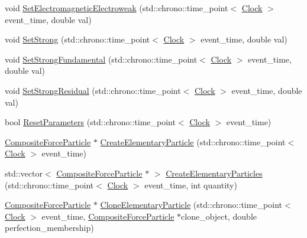 \begin{DoxyCompactItemize}
\item 
void \mbox{\hyperlink{classCompositeForceParticle_ad53c5d396b3c56241174a9bd78f9e07a}{Set\+Electromagnetic\+Electroweak}} (std\+::chrono\+::time\+\_\+point$<$ \mbox{\hyperlink{universe_8h_a0ef8d951d1ca5ab3cfaf7ab4c7a6fd80}{Clock}} $>$ event\+\_\+time, double val)
\item 
void \mbox{\hyperlink{classCompositeForceParticle_a06488ef0457335648b161d3ed746b643}{Set\+Strong}} (std\+::chrono\+::time\+\_\+point$<$ \mbox{\hyperlink{universe_8h_a0ef8d951d1ca5ab3cfaf7ab4c7a6fd80}{Clock}} $>$ event\+\_\+time, double val)
\item 
void \mbox{\hyperlink{classCompositeForceParticle_a28d835658edcbecf60162475a8cb1ab6}{Set\+Strong\+Fundamental}} (std\+::chrono\+::time\+\_\+point$<$ \mbox{\hyperlink{universe_8h_a0ef8d951d1ca5ab3cfaf7ab4c7a6fd80}{Clock}} $>$ event\+\_\+time, double val)
\item 
void \mbox{\hyperlink{classCompositeForceParticle_aeba1070d4ec6e52fd8276e38c6a6c2e1}{Set\+Strong\+Residual}} (std\+::chrono\+::time\+\_\+point$<$ \mbox{\hyperlink{universe_8h_a0ef8d951d1ca5ab3cfaf7ab4c7a6fd80}{Clock}} $>$ event\+\_\+time, double val)
\item 
bool \mbox{\hyperlink{classCompositeForceParticle_ab4767179e32f6d2b4b31941dd3c48b10}{Reset\+Parameters}} (std\+::chrono\+::time\+\_\+point$<$ \mbox{\hyperlink{universe_8h_a0ef8d951d1ca5ab3cfaf7ab4c7a6fd80}{Clock}} $>$ event\+\_\+time)
\item 
\mbox{\hyperlink{classCompositeForceParticle}{Composite\+Force\+Particle}} $\ast$ \mbox{\hyperlink{classCompositeForceParticle_a0806069e389e30c63572c4cd6b9776d7}{Create\+Elementary\+Particle}} (std\+::chrono\+::time\+\_\+point$<$ \mbox{\hyperlink{universe_8h_a0ef8d951d1ca5ab3cfaf7ab4c7a6fd80}{Clock}} $>$ event\+\_\+time)
\item 
std\+::vector$<$ \mbox{\hyperlink{classCompositeForceParticle}{Composite\+Force\+Particle}} $\ast$ $>$ \mbox{\hyperlink{classCompositeForceParticle_afff866fe6f363c33c3b49fcca9005706}{Create\+Elementary\+Particles}} (std\+::chrono\+::time\+\_\+point$<$ \mbox{\hyperlink{universe_8h_a0ef8d951d1ca5ab3cfaf7ab4c7a6fd80}{Clock}} $>$ event\+\_\+time, int quantity)
\item 
\mbox{\hyperlink{classCompositeForceParticle}{Composite\+Force\+Particle}} $\ast$ \mbox{\hyperlink{classCompositeForceParticle_a559031016355b79ee795e621fdbbdb13}{Clone\+Elementary\+Particle}} (std\+::chrono\+::time\+\_\+point$<$ \mbox{\hyperlink{universe_8h_a0ef8d951d1ca5ab3cfaf7ab4c7a6fd80}{Clock}} $>$ event\+\_\+time, \mbox{\hyperlink{classCompositeForceParticle}{Composite\+Force\+Particle}} $\ast$clone\+\_\+object, double perfection\+\_\+membership)

\end{DoxyCompactItemize}
